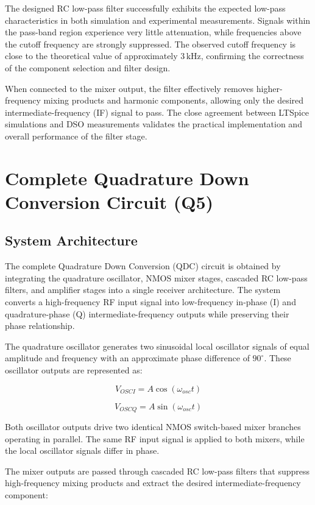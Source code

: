 \documentclass[conference]{IEEEtran}
\begin{document}
The designed RC low-pass filter successfully exhibits the expected low-pass characteristics in both simulation and experimental measurements. 
Signals within the pass-band region experience very little attenuation, while frequencies above the cutoff frequency are strongly suppressed. 
The observed cutoff frequency is close to the theoretical value of approximately $3\,\text{kHz}$, confirming the correctness of the component selection and filter design.

When connected to the mixer output, the filter effectively removes higher-frequency mixing products and harmonic components, allowing only the desired intermediate-frequency (IF) signal to pass. 
The close agreement between LTSpice simulations and DSO measurements validates the practical implementation and overall performance of the filter stage.

\section{Complete Quadrature Down Conversion Circuit (Q5)}

\subsection{System Architecture}

The complete Quadrature Down Conversion (QDC) circuit is obtained by integrating the quadrature oscillator, NMOS mixer stages, cascaded RC low-pass filters, and amplifier stages into a single receiver architecture. 
The system converts a high-frequency RF input signal into low-frequency in-phase (I) and quadrature-phase (Q) intermediate-frequency outputs while preserving their phase relationship.

The quadrature oscillator generates two sinusoidal local oscillator signals of equal amplitude and frequency with an approximate phase difference of $90^\circ$. 
These oscillator outputs are represented as:

\[
V_{OSCI}=A\cos(\omega_{osc}t)
\]

\[
V_{OSCQ}=A\sin(\omega_{osc}t)
\]

Both oscillator outputs drive two identical NMOS switch-based mixer branches operating in parallel. 
The same RF input signal is applied to both mixers, while the local oscillator signals differ in phase.

The mixer outputs are passed through cascaded RC low-pass filters that suppress high-frequency mixing products and extract the desired intermediate-frequency component:
\end{document}
